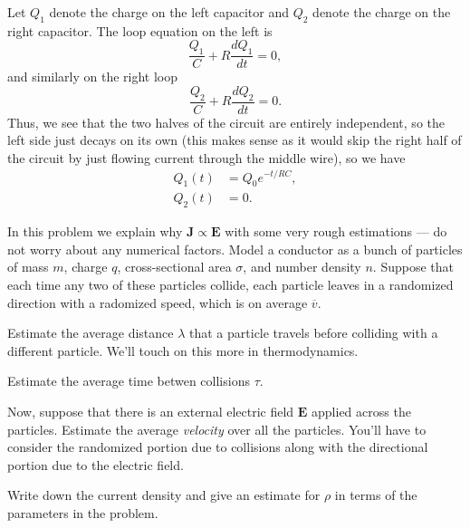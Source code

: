 \documentclass[11pt]{scrartcl}
\begin{document}
\begin{sol}
    Let $Q_1$ denote the charge on the left capacitor and $Q_2$ denote the charge on the right capacitor. The loop equation on the left is
    $$\frac{Q_1}{C} + R \frac{dQ_1}{dt} = 0,$$
    and similarly on the right loop
    $$\frac{Q_2}{C} + R\frac{dQ_2}{dt} = 0.$$
    Thus, we see that the two halves of the circuit are entirely independent, so the left side just decays on its own (this makes sense as it would skip the right half of the circuit by just flowing current through the middle wire), so we have
    \begin{align*}
        Q_1(t) &= Q_0e^{-t/RC},\\
        Q_2(t) &= 0.
    \end{align*}
\end{sol}

\begin{prob}
    In this problem we explain why $\mathbf J \propto \mathbf E$ with some very rough estimations --- do not worry about any numerical factors. Model a conductor as a bunch of particles of mass $m$, charge $q$, cross-sectional area $\sigma$, and number density $n$. Suppose that each time any two of these particles collide, each particle leaves in a randomized direction with a radomized speed, which is on average $\overline{v}$.
    \begin{anum}
        \item Estimate the average distance $\lambda$ that a particle travels before colliding with a different particle. We'll touch on this more in thermodynamics.
        \item Estimate the average time betwen collisions $\tau$.
        \item Now, suppose that there is an external electric field $\mathbf E$ applied across the particles. Estimate the average \textit{velocity} over all the particles. You'll have to consider the randomized portion due to collisions along with the directional portion due to the electric field.
        \item Write down the current density and give an estimate for $\rho$ in terms of the parameters in the problem.
    \end{anum}
\end{prob}
\end{document}

